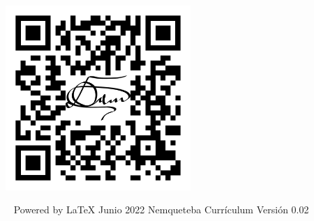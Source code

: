 \documentclass[overlapped,line,final]{res}
\begin{document}
\begin{resume}

\vspace{\fill}
\begin{minipage}{1.0\linewidth}
\begin{center}	
	\includegraphics[width=7cm,bb=0 0 1147 1147]{./qr.png}
\end{center}
\end{minipage}


\vspace{\fill}\ \newline
{\tiny \rm $ $Powered by \LaTeX $ $ }
{\tiny \rm $ $Junio 2022$ $ }
{\tiny \rm $ $Nemqueteba Currículum Versión 0.02 $ $ }

\end{resume}
\end{document}
